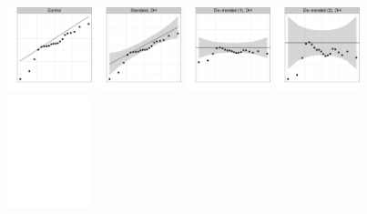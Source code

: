 \documentclass{article}\usepackage[]{graphicx}\usepackage[]{color}
\begin{document}
\begin{figure}
\centering
\includegraphics[width=0.22\textwidth]{figures/qqplots-1}
\includegraphics[width=0.22\textwidth]{figures/qqplots-2}
\includegraphics[width=0.22\textwidth]{figures/qqplots-3}
\includegraphics[width=0.22\textwidth]{figures/qqplots-4}
\includegraphics[width=0.22\textwidth]{figures/blank}

\end{figure}
\end{document}
